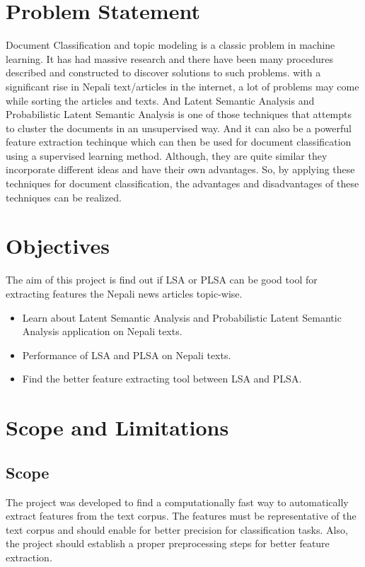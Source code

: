 \documentclass[12pt]{report}
\begin{document}
        
        
        



        

        
    \section{Problem Statement}
        Document Classification and topic modeling is a classic problem in machine learning. It has had massive research and there have been many procedures described and
        constructed to discover solutions to such problems. with a significant rise in Nepali text/articles in the internet, a lot of problems may come 
        while sorting the articles and texts. And Latent Semantic Analysis and Probabilistic Latent Semantic Analysis is one of those techniques that attempts 
        to cluster the documents in an unsupervised way. And it can also be a powerful feature extraction techinque which can then be used for document classification using a 
        supervised learning method. Although, they are quite similar they incorporate different ideas and have their own advantages. So, by applying these techniques for document classification, 
        the advantages and disadvantages of these techniques can be realized. 
    
    \section{Objectives}
        The aim of this project is find out if LSA or PLSA can be good tool for extracting features the Nepali news articles topic-wise.
        \begin{itemize}
            \item Learn about Latent Semantic Analysis and Probabilistic Latent Semantic Analysis application on Nepali texts.
            \item Performance of LSA and PLSA on Nepali texts.
            \item Find the better feature extracting tool between LSA and PLSA.
        \end{itemize}
    
    \section{Scope and Limitations}
        
        \subsection{Scope}
        The project was developed to find a computationally fast way to automatically extract features from the text corpus. 
        The features must be representative of the text corpus and should enable for better precision for classification tasks. 
        Also, the project should establish a proper preprocessing steps for better feature extraction.
\end{document}
